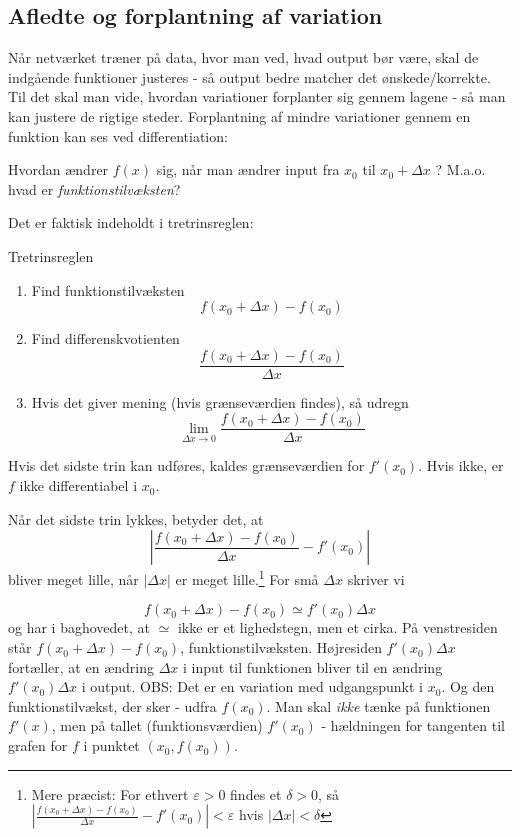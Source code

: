 \documentclass[a4paper, 12pt]{article}
\theoremstyle{remark}
\begin{document}
\subsection*{Afledte og forplantning af variation} Når netværket træner på data, hvor man ved, hvad output bør være, skal de indgående funktioner justeres - så output bedre matcher det ønskede/korrekte. Til det skal man vide, hvordan variationer  forplanter sig gennem lagene - så man kan justere de rigtige steder. Forplantning af mindre variationer gennem en funktion kan ses ved differentiation: 

Hvordan ændrer $f(x)$ sig, når man ændrer input fra $x_0$ til $x_0+\Delta x$ ? M.a.o. hvad er \emph{funktionstilvæksten}?

Det er faktisk indeholdt i tretrinsreglen: 
\begin{tcolorbox}
\begin{center}Tretrinsreglen\end{center}
\begin{enumerate}
\item Find funktionstilvæksten $$f(x_0+\Delta x)-f(x_0)$$
\item Find differenskvotienten $$\frac{f(x_0+\Delta x)-f(x_0)}{\Delta x}$$
\item Hvis det giver mening (hvis grænseværdien findes), så udregn $$\lim_{\Delta x\to 0}\frac{f(x_0+\Delta x)-f(x_0)}{\Delta x}$$
\end{enumerate}
Hvis det sidste trin kan udføres, kaldes grænseværdien for $f'(x_0)$. Hvis ikke, er $f$ ikke differentiabel i $x_0$. 
\end{tcolorbox}
Når det sidste trin lykkes, betyder det, at $$|\frac{f(x_0+\Delta x)-f(x_0)}{\Delta x}-f'(x_0)|$$ bliver meget lille, når $|\Delta x|$ er meget lille.\footnote{Mere præcist: For ethvert $\varepsilon>0$ findes et $\delta >0$, så $|\frac{f(x_0+\Delta x)-f(x_0)}{\Delta x}-f'(x_0)|<\varepsilon$ hvis $|\Delta x|<\delta$}
For små $\Delta x$ skriver vi 

$$f(x_0+\Delta x)-f(x_0)\simeq f'(x_0)\Delta x$$
og har i baghovedet, at $\simeq$ ikke er et lighedstegn, men et cirka. På venstresiden står $f(x_0+\Delta x)-f(x_0)$, funktionstilvæksten. Højresiden $f'(x_0)\Delta x$ fortæller, at en ændring $\Delta x$ i input til funktionen bliver til en ændring $f'(x_0)\Delta x$ i output. 
OBS: Det er en variation med udgangspunkt i $x_0$. Og den funktionstilvækst, der sker - udfra $f(x_0)$. Man skal \emph{ikke} tænke på funktionen $f'(x)$, men på tallet (funktionsværdien)  $f'(x_0)$ - hældningen for tangenten til grafen for $f$ i punktet $(x_0,f(x_0))$. 
\end{document}
